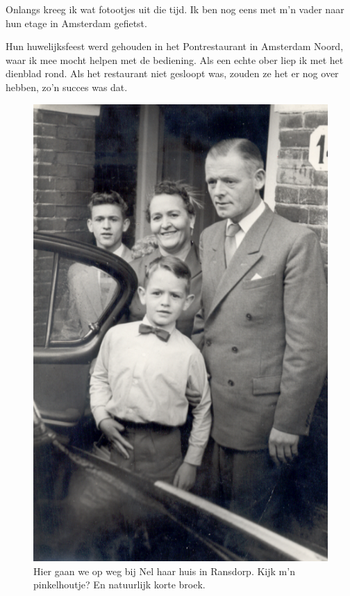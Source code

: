 \documentclass[10pt,twoside, openright]{memoir}
\begin{document}
Onlangs kreeg ik wat fotootjes uit die tijd. Ik ben nog eens met m’n vader naar hun etage in Amsterdam gefietst. 

Hun huwelijksfeest werd gehouden in het Pontrestaurant in Amsterdam Noord, waar ik mee mocht helpen met de bediening. Als een echte ober liep ik met het dienblad rond. Als het restaurant niet gesloopt was, zouden ze het er nog over hebben, zo’n succes was dat.

\begin{figure}
\includegraphics[width=\textwidth]{img/ch5/trouwengn}
\caption*{\footnotesize Hier gaan we op weg bij Nel haar huis in Ransdorp. Kijk m’n pinkelhoutje? En natuurlijk korte broek.}
\end{figure}
\end{document}
